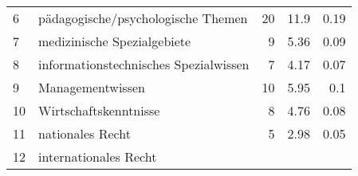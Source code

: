 \begin{longtable}{lXrrr}
     6 &
     \multicolumn{1}{X}{ pädagogische/psychologische Themen   } &


       \num{20} &
       \num[round-mode=places,round-precision=2]{11,9} &
         \num[round-mode=places,round-precision=2]{0,19} \\

     7 &
     \multicolumn{1}{X}{ medizinische Spezialgebiete   } &


       \num{9} &
       \num[round-mode=places,round-precision=2]{5,36} &
         \num[round-mode=places,round-precision=2]{0,09} \\

     8 &
     \multicolumn{1}{X}{ informationstechnisches Spezialwissen   } &


       \num{7} &
       \num[round-mode=places,round-precision=2]{4,17} &
         \num[round-mode=places,round-precision=2]{0,07} \\

     9 &
     \multicolumn{1}{X}{ Managementwissen   } &


       \num{10} &
       \num[round-mode=places,round-precision=2]{5,95} &
         \num[round-mode=places,round-precision=2]{0,1} \\

     10 &
     \multicolumn{1}{X}{ Wirtschaftskenntnisse   } &


       \num{8} &
       \num[round-mode=places,round-precision=2]{4,76} &
         \num[round-mode=places,round-precision=2]{0,08} \\

     11 &
     \multicolumn{1}{X}{ nationales Recht   } &


       \num{5} &
       \num[round-mode=places,round-precision=2]{2,98} &
         \num[round-mode=places,round-precision=2]{0,05} \\

     12 &
     \multicolumn{1}{X}{ internationales Recht   } &



\end{longtable}
